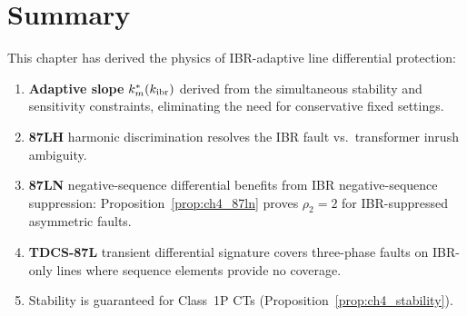 \section{Summary}
\label{sec:ch4_summary}

This chapter has derived the physics of IBR-adaptive line differential
protection:
\begin{enumerate}
\item \textbf{Adaptive slope} $k_m^\ast(k_\mathrm{ibr})$ derived from the
      simultaneous stability and sensitivity constraints, eliminating
      the need for conservative fixed settings.
\item \textbf{87LH} harmonic discrimination resolves the IBR fault vs.\
      transformer inrush ambiguity.
\item \textbf{87LN} negative-sequence differential benefits from IBR
      negative-sequence suppression: Proposition~\ref{prop:ch4_87ln}
      proves $\rho_2 = 2$ for IBR-suppressed asymmetric faults.
\item \textbf{TDCS-87L} transient differential signature covers three-phase
      faults on IBR-only lines where sequence elements provide no coverage.
\item Stability is guaranteed for Class~1P CTs (Proposition~\ref{prop:ch4_stability}).
\end{enumerate}

